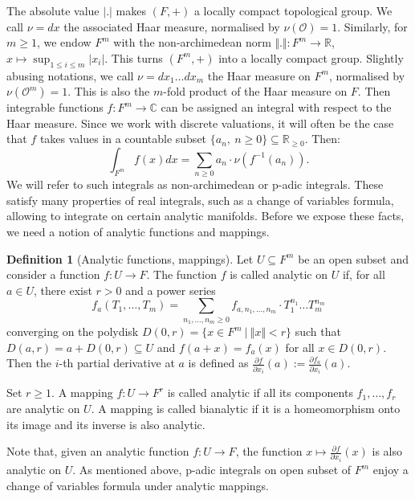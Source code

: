 \documentclass[11pt,english]{article}
\numberwithin{equation}{section}
\numberwithin{figure}{section}
\theoremstyle{definition}
\newtheorem{df}{Definition}[subsection]
\theoremstyle{plain}
\theoremstyle{remark}
\begin{document}
The absolute value $\vert.\vert$ makes $(F,+)$ a locally compact
topological group. We call $\nu=dx$ the associated Haar measure,
normalised by $\nu(\mathcal{O})=1$. Similarly, for $m\geq1$, we
endow $F^{m}$ with the non-archimedean norm $\Vert.\Vert:F^{m}\rightarrow\mathbb{R}$,
$x\mapsto\sup_{1\leq i\leq m}\vert x_{i}\vert$. This turns $(F^{m},+)$
into a locally compact group. Slightly abusing notations, we call
$\nu=dx_{1}\ldots dx_{m}$ the Haar measure on $F^{m}$, normalised
by $\nu(\mathcal{O}^{m})=1$. This is also the $m$-fold product of
the Haar measure on $F$. Then integrable functions $f:F^{m}\rightarrow\mathbb{C}$
can be assigned an integral with respect to the Haar measure. Since
we work with discrete valuations, it will often be the case that $f$
takes values in a countable subset $\{a_{n},\ n\geq0\}\subseteq\mathbb{R}_{\geq0}$.
Then:\[
\int_{F^m}f(x)dx=\sum_{n\geq0}a_n\cdot\nu(f^{-1}(a_n)).
\] We will refer to such integrals as non-archimedean or p-adic integrals.
These satisfy many properties of real integrals, such as a change
of variables formula, allowing to integrate on certain analytic manifolds.
Before we expose these facts, we need a notion of analytic functions
and mappings.

\begin{df}[Analytic functions, mappings]

Let $U\subseteq F^{m}$ be an open subset and consider a function
$f:U\rightarrow F$. The function $f$ is called analytic on $U$
if, for all $a\in U$, there exist $r>0$ and a power series\[
f_{a}(T_1,\ldots,T_m)=\sum_{n_1,\ldots,n_m\geq0}f_{a,n_1,\ldots,n_m}\cdot T_1^{n_1}\ldots T_m^{n_m}
\] converging on the polydisk $D(0,r)=\{x\in F^{m}\ \vert\ \Vert x\Vert<r\}$
such that $D(a,r)=a+D(0,r)\subseteq U$ and $f(a+x)=f_{a}(x)$ for
all $x\in D(0,r)$. Then the $i$-th partial derivative at $a$ is
defined as $\frac{\partial f}{\partial x_{i}}(a):=\frac{\partial f_{a}}{\partial x_{i}}(a)$.

Set $r\geq1$. A mapping $f:U\rightarrow F^{r}$ is called analytic
if all its components $f_{1},\ldots,f_{r}$ are analytic on $U$.
A mapping is called bianalytic if it is a homeomorphism onto its image
and its inverse is also analytic.

\end{df}

Note that, given an analytic function $f:U\rightarrow F$, the function
$x\mapsto\frac{\partial f}{\partial x_{i}}(x)$ is also analytic on
$U$. As mentioned above, p-adic integrals on open subset of $F^{m}$
enjoy a change of variables formula under analytic mappings.
\end{document}
